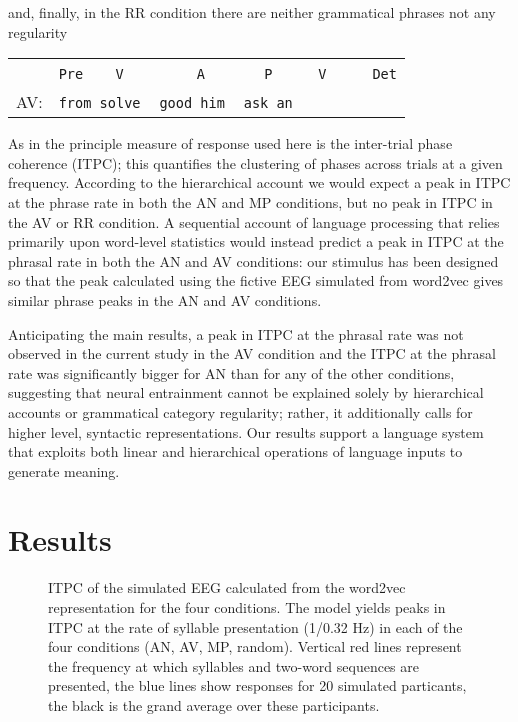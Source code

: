 \documentclass[10pt,letterpaper]{article}
\newcommand{\tts}{%
  \texttt{\,}
}
\begin{document}
and, finally, in the RR condition there are neither grammatical phrases not any regularity
\begin{center}
  \begin{tabular}{cl}
   &\texttt{Pre}\tts{}\tts{}\texttt{V}\tts\tts\tts{}\tts{}\tts{}\texttt{A}\tts{}\tts\tts{}\tts{}\texttt{P}\tts{}\tts{}\tts{}\texttt{V}\tts\tts\tts{}\texttt{Det}\\ 
AV:&\texttt{from solve}\tts\texttt{good him}{}\tts\texttt{ask an}
\end{tabular}
\end{center}

As in \cite{DingEtAl2017} the principle measure of response used here
is the inter-trial phase coherence (ITPC); this quantifies the
clustering of phases across trials at a given frequency. According to
the hierarchical account we would expect a peak in ITPC at the phrase
rate in both the AN and MP conditions, but no peak in ITPC in the AV
or RR condition. A sequential account of language processing that
relies primarily upon word-level statistics would instead predict a
peak in ITPC at the phrasal rate in both the AN and AV conditions: our
stimulus has been designed so that the peak calculated using the
fictive EEG simulated from word2vec gives similar phrase peaks in the
AN and AV conditions.

Anticipating the main results, a peak in ITPC at the phrasal rate was
not observed in the current study in the AV condition and the ITPC at
the phrasal rate was significantly bigger for AN than for any of the
other conditions, suggesting that neural entrainment cannot be
explained solely by hierarchical accounts or grammatical category
regularity; rather, it additionally calls for higher level, syntactic
representations. Our results support a language system that exploits
both linear and hierarchical operations of language inputs to generate
meaning.


\section*{Results}

\begin{figure}[tbhp]

\caption{ITPC of the simulated EEG calculated from the word2vec
  representation for the four conditions. The model yields peaks in
  ITPC at the rate of syllable presentation (1/0.32 Hz) in each of the
  four conditions (AN, AV, MP, random). Vertical red lines represent
  the frequency at which syllables and two-word sequences are
  presented, the blue lines show responses for 20 simulated
  particants, the black is the grand average over these participants.
}
\label{fig:Fig1}
\end{figure}
\end{document}
